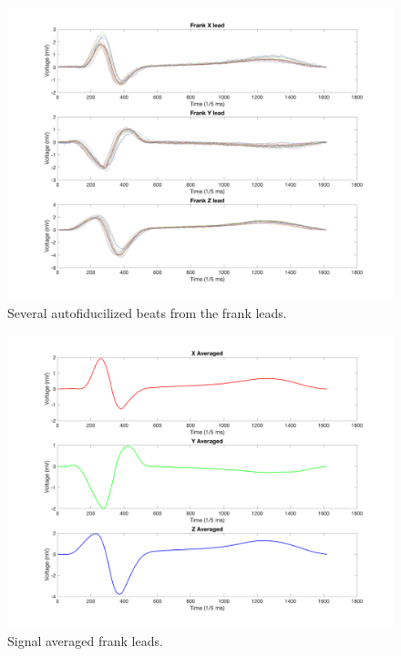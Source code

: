 \documentclass[12pt]{article}
\begin{document}
\begin{figure}[H]
	
	\centering
	\includegraphics[width = .95\textwidth]{Figures/FrankLeads2.png}
	\caption{ Several autofiducilized beats from the frank leads.}
	\label{fig:Frank2}
\end{figure}

\begin{figure}[H]
	
	\centering
	\includegraphics[width = .95\textwidth]{Figures/FrankLeads3.png}
	\caption{Signal averaged frank leads.}
	\label{fig:Frank3}
\end{figure}
\end{document}
